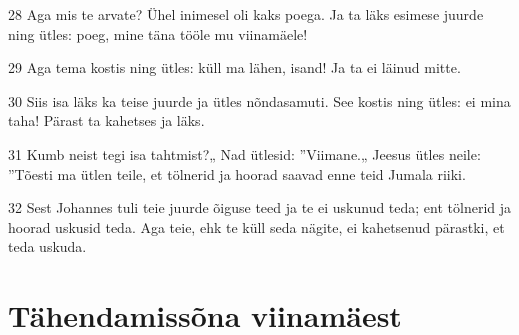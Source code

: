 \par 28 Aga mis te arvate? Ühel inimesel oli kaks poega. Ja ta läks esimese juurde ning ütles: poeg, mine täna tööle mu viinamäele!
\par 29 Aga tema kostis ning ütles: küll ma lähen, isand! Ja ta ei läinud mitte.
\par 30 Siis isa läks ka teise juurde ja ütles nõndasamuti. See kostis ning ütles: ei mina taha! Pärast ta kahetses ja läks.
\par 31 Kumb neist tegi isa tahtmist?„ Nad ütlesid: ”Viimane.„ Jeesus ütles neile: ”Tõesti ma ütlen teile, et tölnerid ja hoorad saavad enne teid Jumala riiki.
\par 32 Sest Johannes tuli teie juurde õiguse teed ja te ei uskunud teda; ent tölnerid ja hoorad uskusid teda. Aga teie, ehk te küll seda nägite, ei kahetsenud pärastki, et teda uskuda.

\section*{Tähendamissõna viinamäest}

